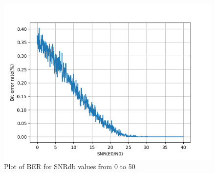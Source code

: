 \begin{figure}[htbp]
    \centering
    \includegraphics[width=\linewidth]{../Source/results/ber.png}
    \caption{Plot of BER for SNRdb values from 0 to 50}
    \label{ber}
\end{figure}


